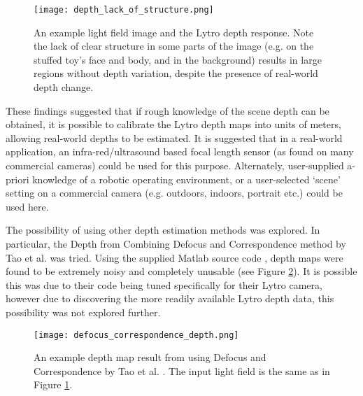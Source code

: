 \begin{figure}
\centering
\texttt{[image: depth\_lack\_of\_structure.png]}
\caption[Lack of Scene Structure Corrupts Lytro Depth Estimation]{An example light field image and the Lytro depth response. Note the lack of clear structure in some parts of the image (e.g. on the stuffed toy's face and body, and in the background) results in large regions without depth variation, despite the presence of real-world depth change.}
\label{fig:depth_lack_of_structure}
\end{figure}

These findings suggested that if rough knowledge of the scene depth can be obtained, it is possible to calibrate the Lytro depth maps into units of meters, allowing real-world depths to be estimated.
It is suggested that in a real-world application, an infra-red/ultrasound based focal length sensor (as found on many commercial cameras) could be used for this purpose.
Alternately, user-supplied a-priori knowledge of a robotic operating environment, or a user-selected \enquote*{scene} setting on a commercial camera (e.g. outdoors, indoors, portrait etc.) could be used here.

The possibility of using other depth estimation methods was explored.
In particular, the Depth from Combining Defocus and Correspondence method by Tao et al. \cite{tao2013depth} was tried.
Using the supplied Matlab source code \cite{tao2013depthwebsite}, depth maps were found to be extremely noisy and completely unusable (see Figure \ref{fig:defocus_correspondence_depth}).
It is possible this was due to their code being tuned specifically for their Lytro camera, however due to discovering the more readily available Lytro depth data, this possibility was not explored further.


\begin{figure}
\centering
\texttt{[image: defocus\_correspondence\_depth.png]}
\caption[Depth Map from combining Defocus and Correspondence]{
An example depth map result from using Defocus and Correspondence by Tao et al. \cite{tao2013depthwebsite}.
The input light field is the same as in Figure \ref{fig:depth_lack_of_structure}.
}
\label{fig:defocus_correspondence_depth}
\end{figure}
